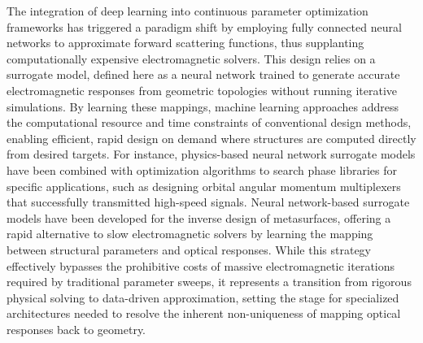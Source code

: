\documentclass[11pt]{article}
\begin{document}
The integration of deep learning into continuous parameter optimization frameworks has triggered a paradigm shift by employing fully connected neural networks to approximate forward scattering functions, thus supplanting computationally expensive electromagnetic solvers. This design relies on a surrogate model, defined here as a neural network trained to generate accurate electromagnetic responses from geometric topologies without running iterative simulations. \citep{doi_10_1109_jmmct_2025_3544270_6b4eb6dd} By learning these mappings, machine learning approaches address the computational resource and time constraints of conventional design methods, enabling efficient, rapid design on demand where structures are computed directly from desired targets. For instance, physics-based neural network surrogate models have been combined with optimization algorithms to search phase libraries for specific applications, such as designing orbital angular momentum multiplexers that successfully transmitted high-speed signals. Neural network-based surrogate models have been developed for the inverse design of metasurfaces, offering a rapid alternative to slow electromagnetic solvers by learning the mapping between structural parameters and optical responses. \citep{doi_10_1364_prj_450564_4b46735d} While this strategy effectively bypasses the prohibitive costs of massive electromagnetic iterations required by traditional parameter sweeps, it represents a transition from rigorous physical solving to data-driven approximation, setting the stage for specialized architectures needed to resolve the inherent non-uniqueness of mapping optical responses back to geometry. \citep{doi_10_71465_fapm546_bda368a5} \citep{doi_10_1364_prj_450564_4b46735d} \citep{doi_10_1088_1361_6463_ab8036_d433363a}
\end{document}

